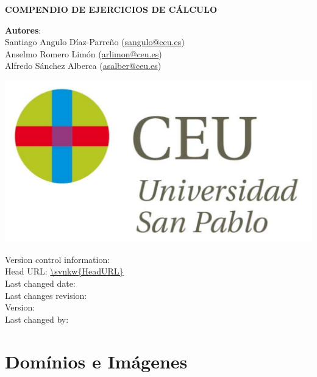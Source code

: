 \documentclass[a4paper,titlepage]{article}
\begin{document}
\sloppy

\begin{titlepage}
\vspace*{5cm}
\begin{center}
{\huge \bf COMPENDIO DE EJERCICIOS DE CÁLCULO\par}
\vspace{0.5cm}
{\large \noindent \textbf{Autores}: \\
   Santiago Angulo Díaz-Parreño (\url{sangulo@ceu.es})\\
   Anselmo Romero Limón (\url{arlimon@ceu.es})\\
   Alfredo Sánchez Alberca (\url{asalber@ceu.es})
}

\vspace{1cm}
 \includegraphics[scale=0.3]{img/logo_uspceu_01}
\end{center}
 \vfill
 \flushleft\sffamily
 Version control information:\\
 Head URL: \url{\svnkw{HeadURL}}\\
 Last changed date: \svndate\\
 Last changes revision: \svnrev\\
 Version: \svnFullRevision*{\svnrev}\\
 Last changed by: \svnFullAuthor*{\svnauthor}\\
\end{titlepage}

\setcounter{tocdepth}{2}
\tableofcontents
\newpage

\section{Domínios e Imágenes}
\begin{enumerate}[leftmargin=*]
\end{enumerate}
\end{document}
